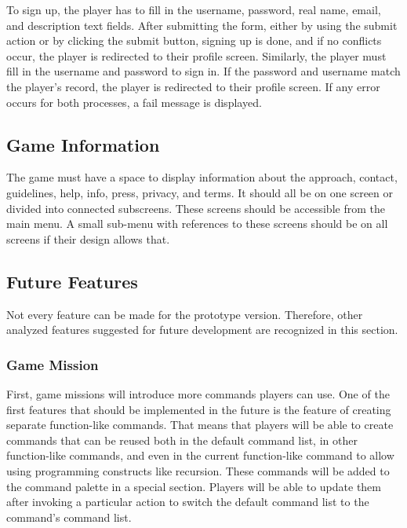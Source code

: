 To sign up, the player has to fill in the username, password, real name, email, and description text fields.
After submitting the form, either by using the submit action or by clicking the submit button, signing up is done, and if no conflicts occur, the player is redirected to their profile screen.
Similarly, the player must fill in the username and password to sign in.
If the password and username match the player's record, the player is redirected to their profile screen.
If any error occurs for both processes, a fail message is displayed.

\subsection{Game Information}
\label{analysis:game:game-information}

The game must have a space to display information about the approach, contact, guidelines, help, info, press, privacy, and terms.
It should all be on one screen or divided into connected subscreens.
These screens should be accessible from the main menu.
A small sub-menu with references to these screens should be on all screens if their design allows that.

\subsection{Future Features}
\label{analysis:game:future-features}

Not every feature can be made for the prototype version.
Therefore, other analyzed features suggested for future development are recognized in this section.

\subsubsection{Game Mission}

First, game missions will introduce more commands players can use.
One of the first features that should be implemented in the future is the feature of creating separate function-like commands.
That means that players will be able to create commands that can be reused both in the default command list, in other function-like commands, and even in the current function-like command to allow using programming constructs like recursion.
These commands will be added to the command palette in a special section.
Players will be able to update them after invoking a particular action to switch the default command list to the command's command list.

